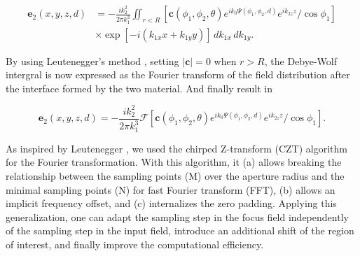 \documentclass[9pt,twocolumn,twoside]{osajnl}
\begin{document}
\begin{equation}
	\begin{aligned}\label{eq:16}
		\mathbf{e}_2(x,y,z,d)&=-\frac{ik^2_2}{2\pi k^3_1}
		\iint_{r<R}[\mathbf{c}(\phi_1,\phi_2,\theta)e^{ik_0\Psi(\phi_1,\phi_2,d)}e^{ik_{2z}z}/\cos\phi_1]\\
		&\times \exp[-i(k_{1x}x+k_{1y}y)]\,dk_{1x}\,dk_{1y}.
	\end{aligned}
\end{equation}

By using Leutenegger's method \cite{leutenegger2006fast}, setting $|\mathbf{c}|=0$ when $r>R$, the Debye-Wolf intergral is now expressed as the Fourier transform of the field distribution after the interface formed by the two material. And finally result in

\begin{equation}\label{eq:17}
	\mathbf{e}_2(x,y,z,d)=-\frac{ik^2_2}{2\pi k^3_1}\mathcal{F}[\mathbf{c}(\phi_1,\phi_2,\theta)e^{ik_0\Psi(\phi_1,\phi_2,d)}e^{ik_{2z}z}/\cos\phi_1].
\end{equation}

As inspired by Leutenegger \cite{leutenegger2006fast}, we used the chirped Z-transform (CZT) algorithm \cite{Bakx2002} for the Fourier transformation. With this algorithm, it (a) allows breaking the relationship between the sampling points (M) over the aperture radius and the minimal sampling points (N) for fast Fourier transform (FFT), (b) allows an implicit frequency offset, and (c) internalizes the zero padding. Applying this generalization, one can adapt the sampling step in the focus field independently of the sampling step in the input field, introduce an additional shift of the region of interest, and finally improve the computational efficiency.
\end{document}
